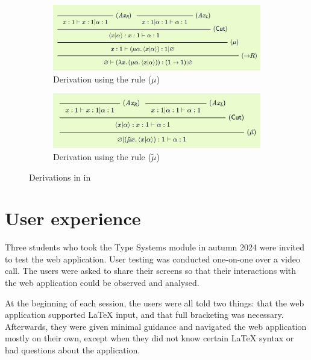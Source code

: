 \begin{figure}[!htbp]
    \centering
    \begin{subfigure}{\textwidth}
        \centering
        \includegraphics[width=\textwidth]{evaluation/lambda-bar-mu-derivation-mu.png}
        \caption{Derivation using the rule ($\mu$)}
    \end{subfigure}%
    \bigskip\hrulefill\bigskip
    \begin{subfigure}{\textwidth}
        \centering
        \includegraphics[width=\textwidth]{evaluation/lambda-bar-mu-derivation-tilde-mu.png}
        \caption{Derivation using the rule ($\tilde{\mu}$)}
    \end{subfigure}
    \caption{Derivations in \lbm{} in \projectname{}}
    \label{fig:evaluation:lambda-bar-mu-derivations}
\end{figure}

\section{User experience}
\label{evaluation:ux}
Three students who took the Type Systems module in autumn 2024 were invited to test the web application. User testing was conducted one-on-one over a video call. The users were asked to share their screens so that their interactions with the web application could be observed and analysed.

At the beginning of each session, the users were all told two things: that the web application supported \LaTeX{} input, and that full bracketing was necessary. Afterwards, they were given minimal guidance and navigated the web application mostly on their own, except when they did not know certain \LaTeX{} syntax or had questions about the application.

